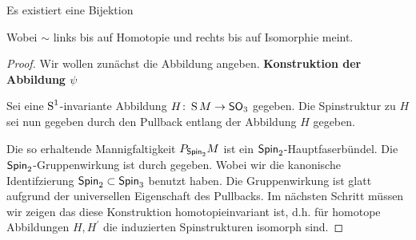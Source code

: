 \begin{Satz}\label{satz:spinstrukturen}
	Es existiert eine Bijektion
	\begin{center}
	\end{center}
	Wobei $ \sim $ links bis auf Homotopie und rechts bis auf Isomorphie meint.
	\begin{proof}

		Wir wollen zunächst die Abbildung angeben.
          \textbf{Konstruktion der Abbildung $\psi$}
		
          Sei eine $\S^1$-invariante Abbildung
          $\abb{H}{\S M}{\so_3}$ gegeben. Die Spinstruktur zu $ H $
          sei nun gegeben durch den Pullback entlang der Abbildung $ H $
          gegeben.
              \begin{center}
            \end{center}
          Die so erhaltende Mannigfaltigkeit $ \Ph{\spin_2}{M} $ ist ein
          $ \spin_2 $-Hauptfaserbündel. Die $ \spin_2 $-Gruppenwirkung
          ist durch
          gegeben. Wobei wir die kanonische Identifzierung $ \spin_2\subset\spin_3 $ benutzt haben. Die Gruppenwirkung ist
          glatt aufgrund der universellen Eigenschaft des Pullbacks.
	       Im nächsten Schritt müssen wir zeigen das diese Konstruktion
	        homotopieinvariant ist, d.h. für homotope Abbildungen $ H,H^{'} $ die induzierten Spinstrukturen isomorph sind.
	        

\end{proof}
\end{Satz}
